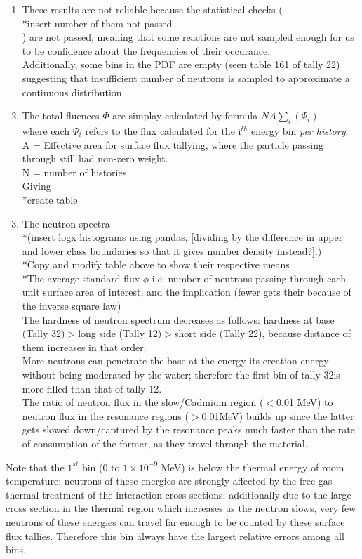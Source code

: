 \documentclass[a4paper, 12pt]{article}
\begin{document}
\begin{enumerate}
	\item These results are not reliable because the statistical checks (\\*insert number of them not passed\\) are not passed, meaning that some reactions are not sampled enough for us to be confidence about the frequencies of their occurance.
	\\Additionally, some bins in the PDF are empty (seen table 161 of tally 22) suggesting that insufficient number of neutrons is sampled to approximate a continuous distribution.
	\item The total fluences $\Phi$ are simplay calculated by formula $N A \sum_i (\Psi_i)$ 
		\\where each $\Psi_i$ refers to the flux calculated for the i${}^{th}$ energy bin \emph{per history}.
		\\      A = Effective area for surface flux tallying, where the particle passing through still had non-zero weight.
		\\      N = number of histories
		\\Giving \\*create table
	\item The neutron spectra 
	\\*(insert logx histograms using pandas, [dividing by the difference in upper and lower class boundaries so that it gives number density instead?].)
	\\*Copy and modify table above to show their respective means
	\\*The average standard flux $\phi$ i.e. number of neutrons passing through each unit surface area of interest, and the implication (fewer gets their because of the inverse square law)
	\\The hardness of neutron spectrum decreases as follows: hardness at base (Tally 32)$>$long side (Tally 12)$>$short side (Tally 22), because distance of them increases in that order.
	\\More neutrons can penetrate the base at the energy its creation energy without being moderated by the water; therefore the first bin of tally 32is more filled than that of tally 12. 
	\\The ratio of neutron flux in the slow/Cadmium region ($<$0.01 MeV) to neutron flux in the resonance regions ($>$0.01MeV) builds up since the latter gets slowed down/captured by the resonance peaks much faster than the rate of consumption of the former, as they travel through the material.
\end{enumerate}
Note that the $1^{st}$ bin ($0$ to $1\times 10^{-9}$ MeV) is below the thermal energy of room temperature; neutrons of these energies are strongly affected by the free gas thermal treatment of the interaction cross sections; additionally due to the large cross section in the thermal region which increases as the neutron slows, very few neutrons of these energies can travel far enough to be counted by these surface flux tallies. Therefore this bin always have the largest relative errors among all bins.
\end{document}
